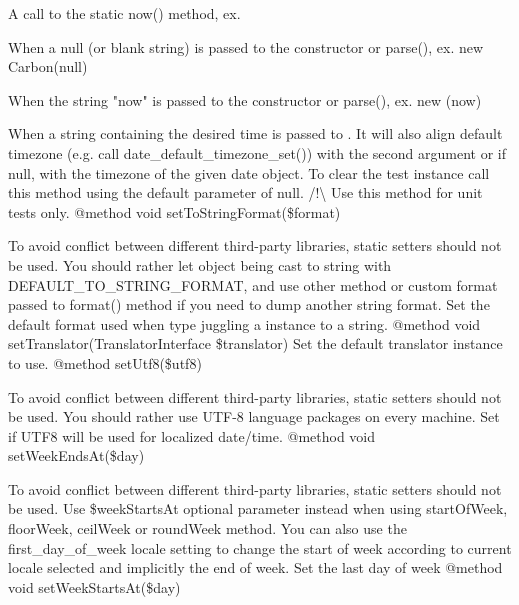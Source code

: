 \begin{DoxyRefList}
\begin{DoxyItemize}
\item A call to the static now() method, ex. 
\item When a null (or blank string) is passed to the constructor or parse(), ex. new Carbon(null)
\item When the string "{}now"{} is passed to the constructor or parse(), ex. new (\textquotesingle{}now\textquotesingle{})
\item When a string containing the desired time is passed to . It will also align default timezone (e.\+g. call date\+\_\+default\+\_\+timezone\+\_\+set()) with the second argument or if null, with the timezone of the given date object. To clear the test instance call this method using the default parameter of null. /!\textbackslash{} Use this method for unit tests only. @method void set\+To\+String\+Format(\$format) 
\end{DoxyItemize}



To avoid conflict between different third-\/party libraries, static setters should not be used. You should rather let  object being cast to string with DEFAULT\+\_\+\+TO\+\_\+\+STRING\+\_\+\+FORMAT, and use other method or custom format passed to format() method if you need to dump another string format. Set the default format used when type juggling a  instance to a string. @method void set\+Translator(Translator\+Interface \$translator) Set the default translator instance to use. @method  set\+Utf8(\$utf8) 



To avoid conflict between different third-\/party libraries, static setters should not be used. You should rather use UTF-\/8 language packages on every machine. Set if UTF8 will be used for localized date/time. @method void set\+Week\+Ends\+At(\$day) 



To avoid conflict between different third-\/party libraries, static setters should not be used. Use \$week\+Starts\+At optional parameter instead when using start\+Of\+Week, floor\+Week, ceil\+Week or round\+Week method. You can also use the \textquotesingle{}first\+\_\+day\+\_\+of\+\_\+week\textquotesingle{} locale setting to change the start of week according to current locale selected and implicitly the end of week. Set the last day of week @method void set\+Week\+Starts\+At(\$day) 




\end{DoxyRefList}
